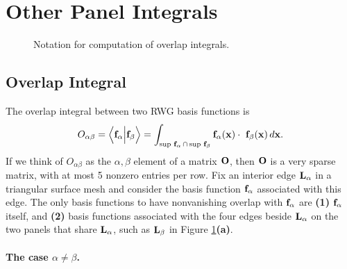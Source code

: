 \documentclass[letterpaper]{article}
\begin{document}
\section{Other Panel Integrals}
\begin{figure}
\caption{Notation for computation of overlap integrals.}
\label{OverlapIntegralFigure}
\end{figure}

\subsection{Overlap Integral}

The overlap integral between two RWG basis functions is 
$$ O_{\alpha\beta}=
\Big<\mathbf{f}_\alpha \Big | \mathbf{f}_\beta\Big > 
=\int_{\text{\scriptsize sup }\mathbf{f}_\alpha\, \cap \,
        \text{\scriptsize sup }\mathbf{f}_\beta } 
  \mathbf{f}_\alpha(\mathbf{x}) \cdot \ \mathbf{f}_\beta(\mathbf{x})
   \,d\mathbf{x}.
$$
If we think of $O_{\alpha\beta}$ as the $\alpha,\beta$ element of 
a matrix $\mathbf{O}$, then $\mathbf{O}$ is a very sparse matrix, with
at most 5 nonzero entries per row. Fix an interior edge 
$\mathbf{L}_\alpha$ in a triangular surface mesh and consider the 
basis function $\mathbf{f}_\alpha$ associated with this edge.
The only basis functions to have nonvanishing overlap with 
$\mathbf{f}_\alpha$ are \textbf{(1)} $\mathbf{f}_\alpha$ itself, and 
\textbf{(2)} basis functions associated with the four 
edges beside $\mathbf{L}_\alpha$ on the two panels that 
share $\mathbf{L}_\alpha$, such as $\mathbf{L}_\beta$ in Figure 
\ref{OverlapIntegralFigure}\textbf{(a)}.

\paragraph{The case $\alpha\ne \beta$.} 
\end{document}
